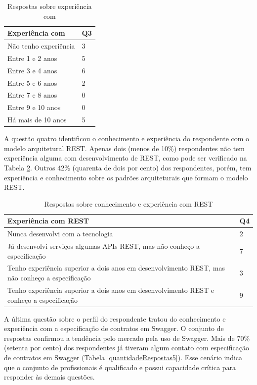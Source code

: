 \begin{table}[!bth] 
\centering
\scriptsize
\begin{tabular}{p{3cm}|p{1cm}}
\hline   
Experiência com \ws{} & Q3 \\
\hline   
Não tenho experiência &  3  \\
Entre 1 e 2 anos      &  5  \\
Entre 3 e 4 anos      &  6  \\
Entre 5 e 6 anos      &  2  \\
Entre 7 e 8 anos      &  0  \\
Entre 9 e 10 anos     &  0  \\
Há mais de 10 anos    &  5  \\
\end{tabular}
\caption{Respostas sobre experiência com \wss{}}
\label{quantidadeRespostas3}
\end{table}        

A questão quatro identificou o conhecimento e experiência do respondente com o
modelo arquitetural REST. Apenas dois (menos de 10\%) respondentes não tem
experiência alguma com desenvolvimento de \wss{} REST, como pode ser verificado na Tabela
\ref{quantidadeRespostas4}. Outros 42\% (quarenta de dois por cento) dos
respondentes, porém, tem experiência e conhecimento sobre os padrões arquiteturais que formam
o modelo REST.

\begin{table}[!bth] 
\centering
\scriptsize
\begin{tabular}{p{6cm}|p{1cm}}
\hline   
Experiência com REST & Q4 \\
\hline   
Nunca desenvolvi com a tecnologia &  2  \\
\cellcolor{light-gray}Já desenvolvi serviços algumas APIs REST, mas não conheço
a especificação & \cellcolor{light-gray}7 \\
Tenho experiência superior a dois anos em desenvolvimento REST, mas não conheço
a especificação & 3 \\
\cellcolor{light-gray}Tenho experiência superior a dois anos em desenvolvimento
REST e conheço a especificação &  \cellcolor{light-gray}9  \\

\end{tabular}
\caption{Respostas sobre conhecimento e experiência com REST}
\label{quantidadeRespostas4}
\end{table}

A última questão sobre o perfil do respondente tratou do conhecimento e
experiência com a especificação de contratos em Swagger. O conjunto de respostas
confirmou a tendência pelo mercado pela uso de Swagger. Mais de 70\% (setenta
por cento) dos respondentes já tiveram algum contato com especificação de
contratos em Swagger (Tabela \ref{quantidadeRespostas5}). Esse cenário indica
que o conjunto de profissionais é qualificado e possui capacidade crítica para
responder às demais questões.

